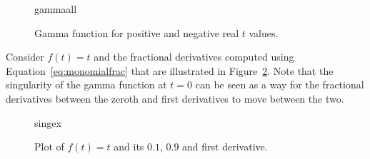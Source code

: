 \begin{figure}
  \centering
  {gammaall}
  \caption{Gamma function for positive and negative real $t$ values.}
\label{fig:gammaall}
\end{figure}

\begin{example}
  Consider $f(t) = t$ and the fractional derivatives computed using Equation~\ref{eq:monomialfrac} that are illustrated in Figure~\ref{fig:singex}. Note that the singularity of the gamma function at $t=0$ can be seen as a way for the fractional derivatives between the zeroth and first derivatives to move between the two.
\end{example}

\begin{figure}
  \centering
  {singex}
  \caption{Plot of $f(t) = t$ and its $0.1$, $0.9$ and first derivative.}
  \label{fig:singex}
\end{figure}

